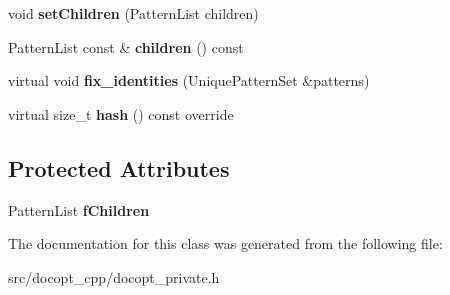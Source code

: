 \begin{DoxyCompactItemize}
$$\item 
\mbox{\label{classdocopt_1_1BranchPattern_a1b4609af47df9ebba57067e2cb5d762d}} 
void {\bfseries set\+Children} (Pattern\+List children)
\item 
\mbox{\label{classdocopt_1_1BranchPattern_aa9bb7831bd3335c84de284086fa89d55}} 
Pattern\+List const  \& {\bfseries children} () const
\item 
\mbox{\label{classdocopt_1_1BranchPattern_a46f26e4a11c66913472100a2abdb6463}} 
virtual void {\bfseries fix\+\_\+identities} (Unique\+Pattern\+Set \&patterns)
\item 
\mbox{\label{classdocopt_1_1BranchPattern_a0eb838adc74441c109e38c7a07da2519}} 
virtual size\+\_\+t {\bfseries hash} () const override
\end{DoxyCompactItemize}
\subsection*{Protected Attributes}
\begin{DoxyCompactItemize}
\item 
\mbox{\label{classdocopt_1_1BranchPattern_ad34855b839d62d4bfcdfb9cf0b5903cc}} 
Pattern\+List {\bfseries f\+Children}
\end{DoxyCompactItemize}


The documentation for this class was generated from the following file\+:\begin{DoxyCompactItemize}
\item 
src/docopt\+\_\+cpp/docopt\+\_\+private.\+h\end{DoxyCompactItemize}

